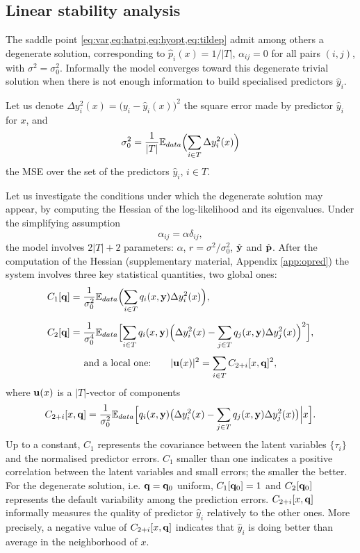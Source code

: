 \subsection{Linear stability analysis}\label{sec:stability}
The saddle point \cref{eq:var,eq:hatpi,eq:hyopt,eq:tildep} admit among others a degenerate 
solution, corresponding to $\hat p_i(x) = 1/\vert T\vert$, $\alpha_{ij}=0$ for all pairs $(i,j)$, 
with $\sigma^2 = \sigma_0^2$. Informally the model converges toward this degenerate trivial 
solution when there is not enough information to build specialised predictors $\hat y_i$. 

Let us denote $\Delta y_i^2(x)= \bigl(y_i-\hat y_i(x)\bigr)^2$ the square error made by predictor 
$\hat y_i$ for $x$, and 
\[
  \sigma_0^2 = \frac{1}{|T|}{\mathbb E}_{data}\Bigl(\sum_{i \in T } \Delta y_i^2(x)\Bigr)
\]
the MSE over the set of the predictors $\hat y_i$, $i \in T$. 

Let us investigate the conditions under which the degenerate solution may appear, by computing the 
Hessian of the log-likelihood and its eigenvalues. Under the simplifying assumption
\[
  \alpha_{ij} = \alpha \delta_{ij},
\]
the model involves $2\vert T\vert+2$ parameters: $\alpha$, $r = \sigma^2/\sigma_0^2$, 
$\hat {\bf y}$ and $\hat{\bf p}$. After the computation of the Hessian (supplementary material, 
Appendix \ref{app:opred}) the system involves three key statistical quantities, two global ones:
%
\begin{align}
  C_1[{\bf q}] &= \frac{1}{\sigma_0^2}{
    \mathbb E}_{data}
      \Bigl(
        \sum_{i \in T} q_i(x,{\bf y})\Delta y_i^2(x)
      \Bigr), \label{def:C1}\\[0.2cm]
  C_2[{\bf q}] &= \frac{1}{\sigma_0^4} {\mathbb E}_{data} 
    \Bigl[\sum_{i\in T}q_i(x,{\bf y})
      \Bigl(
        \Delta y_i^2(x)-\sum_{j \in T} q_j(x,{\bf y})\Delta y_j^2(x)
      \Bigr)^2
    \Bigr],\label{def:C2}
\end{align}
%
\[
  \text{and a local one:}\qquad \vert {\bf u}(x)\vert^2 = \sum_{i\in T} C_{2+i}[x,{\bf q}]^2,
\]
%
where ${\bf u}(x)$ is a $\vert T\vert$-vector of components 
%
\[
  C_{2+i}[x,{\bf q}] = \frac{1}{\sigma_0^2}{\mathbb E}_{data}
    \Bigl[ q_i(x,{\bf y})
      \bigl(
        \Delta y_i^2(x)-\sum_{j \in T} q_j(x,{\bf y})\Delta y_j^2(x)
      \bigr)\Big\vert x 
    \Bigr].
\]
%
Up to a constant, $C_1$ represents the covariance between the latent variables $\{\tau_i\}$ and the 
normalised predictor errors. $C_1$ smaller than one indicates a positive correlation between the 
latent variables and small errors; the smaller the better. For the degenerate solution, i.e. 
${\bf q}={\bf q}_{0}$ uniform, $C_1[{\bf q}_{0}]=1$ and $C_2[{\bf q}_{0}]$ represents the default variability among the 
prediction errors. $C_{2+i}[x,{\bf q}]$ informally measures the quality of predictor $\hat y_i$ 
relatively to the other ones. More precisely, a negative value of  $C_{2+i}[x,{\bf q}]$ indicates 
that $\hat y_i$ is doing better than average in the neighborhood of $x$.  

